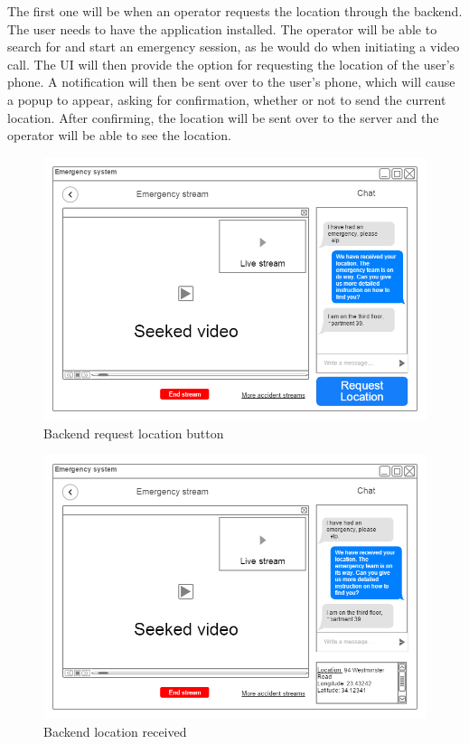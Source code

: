 \documentclass{article}
\begin{document}
The first one will be when an operator requests the location through the backend. The user needs to have the application installed. The operator will be able to search for and start an emergency session, as he would do when initiating a video call. The UI will then provide the option for requesting the location of the user’s phone. A notification will then be sent over to the user’s phone, which will cause a popup to appear, asking for confirmation, whether or not to send the current location. After confirming, the location will be sent over to the server and the operator will be able to see the location.
	\begin{figure}[H]
		\centering
		\includegraphics[width=1\textwidth]{"AutomaticVideoSending/locationbackendrequest"}
		Backend request location button
	\end{figure}
	
	
	\begin{figure}[H]
		\centering
		\vspace{-30pt}
		\includegraphics[width=1\textwidth]{"AutomaticVideoSending/locationbackendreceived"}
		Backend location received
		
		\vspace{-17pt}
	\end{figure}
	
\end{document}
